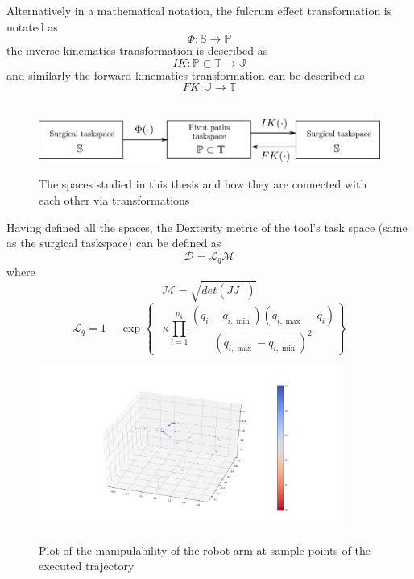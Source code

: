 Alternatively in a mathematical notation, the fulcrum effect transformation is notated as
\begin{equation}
Φ: \mathbb{S} \longrightarrow \mathbb{P}
\end{equation}
the inverse kinematics transformation is described as
\begin{equation}
IK: \mathbb{P} \subset \mathbb{T} \longrightarrow \mathbb{J}
\end{equation}
and similarly the forward kinematics transformation can be described as
\begin{equation}
FK: \mathbb{J} \longrightarrow \mathbb{T}
\end{equation}\\

\begin{center}
\begin{figure}[!htb]
\centering
\includegraphics[width=\textwidth]{images/spaces-and-transformations.png}\\
\caption{The spaces studied in this thesis and how they are connected with each other via transformations}
\label{surgical-taskspace}
\end{figure}
\end{center}

Having defined all the spaces, the Dexterity metric of the tool's task space (same as the surgical taskspace) can be defined as
\begin{equation}
\mathcal{D} = \mathcal{L}_q \mathcal{M}
\label{dexterity-measure}
\end{equation}
where
\begin{equation}
\mathcal{M} = \sqrt{det(J J^\top)}
\end{equation}
\begin{equation}
\label{joint-limit-measure}
\mathcal{L}_{q}=1-\exp\left\{-\kappa\prod_{i=1}^{n_{k}}\frac{(q_{ {i}}-q_{i,\min})(q_{i,\max}-q_{i})}{(q_{i,\max}-q_{i,\min})^{2}}\right\}
\end{equation}

\begin{center}
\begin{figure}[!htb]
\centering
\includegraphics[width=10cm]{images/robot-planner1-manipulability-plot.png}\\
\caption{Plot of the manipulability of the robot arm at sample points of the executed trajectory}
\label{robot-planner1-manipulability-plot}
\end{figure}
\end{center}

